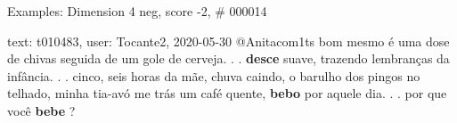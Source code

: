 \begin{frame}{Examples: Dimension 4 neg, score -2, \# 000014}
\footnotesize
\begin{alertblock}{text: t010483, user: Tocante2, 2020-05-30}
@Anitacom1ts bom mesmo é uma dose de chivas seguida de um gole de cerveja. . . 
\textbf{desce} suave, trazendo lembranças da infância. . . cinco, seis horas da 
mãe, chuva caindo, o barulho dos pingos no telhado, minha tia-avó me trás um 
café quente, \textbf{bebo} por aquele dia. . . por que você \textbf{bebe} ? 
\end{alertblock}
\end{frame}
